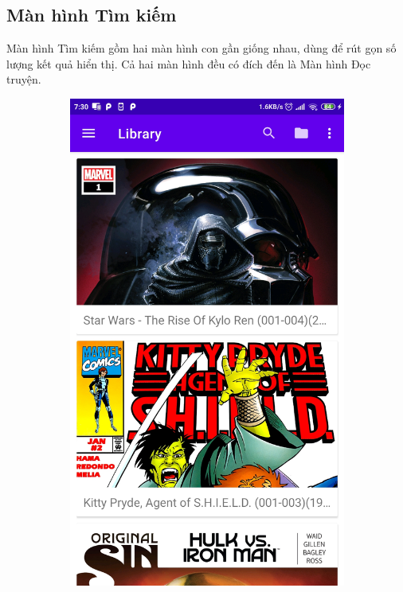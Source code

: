 \documentclass[../../thesis]{subfiles}
\begin{document}
\subsection{Màn hình Tìm kiếm}

Màn hình Tìm kiếm gồm hai màn hình con gần giống nhau, dùng để rút gọn số lượng
kết quả hiển thị. Cả hai màn hình đều có đích đến là Màn hình Đọc truyện.

\begin{figure}[H]
    \centering
    \begin{subfigure}[b]{0.49\textwidth}
        \centering
        \includegraphics[scale=0.12]{../images/Screenshot_2021-05-25-07-30-21-599_com.uet.nvmnghia.yacv}

\end{subfigure}
\end{figure}
\end{document}
